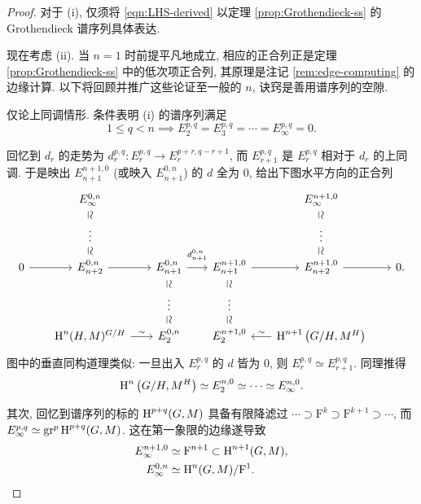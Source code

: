 \begin{proof}
	对于 (i), 仅须将 \eqref{eqn:LHS-derived} 以定理 \ref{prop:Grothendieck-ss} 的 Grothendieck 谱序列具体表达.
	
	现在考虑 (ii). 当 $n=1$ 时前提平凡地成立, 相应的正合列正是定理 \ref{prop:Grothendieck-ss} 中的低次项正合列, 其原理是注记 \ref{rem:edge-computing} 的边缘计算. 以下将回顾并推广这些论证至一般的 $n$, 诀窍是善用谱序列的空隙.

	仅论上同调情形. 条件表明 (i) 的谱序列满足
	\[ 1 \leq q < n \implies E_2^{p, q} = E_3^{p, q} = \cdots = E_\infty^{p, q} = 0. \]
	
	回忆到 $d_r$ 的走势为 $d^{p, q}_r: E_r^{p, q} \to E_r^{p+r, q-r+1}$, 而 $E_{r+1}^{p, q}$ 是 $E_r^{p, q}$ 相对于 $d_r$ 的上同调. 于是映出 $E_{n+1}^{n+1, 0}$ (或映入 $E_{n+1}^{0, n}$) 的 $d$ 全为 $0$, 给出下图水平方向的正合列
	\[\begin{tikzcd}[row sep=small, column sep=scriptsize]
		& E_\infty^{0, n} \arrow[phantom, d, "\simeq" description, sloped] & & & E_\infty^{n+1, 0} \arrow[phantom, d, "\simeq" description, sloped] & \\
		& \vdots \arrow[phantom, d, "\simeq" description, sloped] & & & \vdots \arrow[phantom, d, "\simeq" description, sloped] & \\
		0 \arrow[r] & E_{n+2}^{0, n} \arrow[r] & E_{n+1}^{0, n} \arrow[r, "{d^{0, n}_{n+1}}" inner sep=0.6em] \arrow[phantom, d, "\simeq" description, sloped] & E_{n+1}^{n+1, 0} \arrow[r] \arrow[phantom, d, "\simeq" description, sloped] & E_{n+2}^{n+1, 0} \arrow[r] & 0. \\
		& & \vdots \arrow[phantom, d, "\simeq" description, sloped] & \vdots \arrow[phantom, d, "\simeq" description, sloped] & & \\
		& \Hm^n(H, M)^{G/H} \arrow[r, "\sim"] & E_2^{0, n} & E_2^{n+1, 0} & \Hm^{n+1}\left(G/H, M^H\right) \arrow[l, "\sim"'] &
	\end{tikzcd}\]
	图中的垂直同构道理类似: 一旦出入 $E_r^{p, q}$ 的 $d$ 皆为 $0$, 则 $E_r^{p, q} \simeq E_{r+1}^{p, q}$. 同理推得
	\[ \operatorname{H}^n\left( G/H, M^H \right) \simeq E_2^{n, 0} \simeq \cdots \simeq E_\infty^{n, 0}. \]
	
	其次, 回忆到谱序列的标的 $\operatorname{H}^{p+q}(G, M)$ 具备有限降滤过 $\cdots \supset \mathrm{F}^k \supset \mathrm{F}^{k+1} \supset \cdots$, 而 $E_\infty^{p, q} \simeq \operatorname{gr}^p \operatorname{H}^{p+q}(G, M)$. 这在第一象限的边缘遂导致
	\begin{align*}
		E_\infty^{n+1, 0} & \simeq \mathrm{F}^{n+1} \subset \operatorname{H}^{n+1}(G, M), \\
		E_\infty^{0, n} & \simeq \operatorname{H}^n(G, M) / \mathrm{F}^1 .
	\end{align*}
	

\end{proof}
